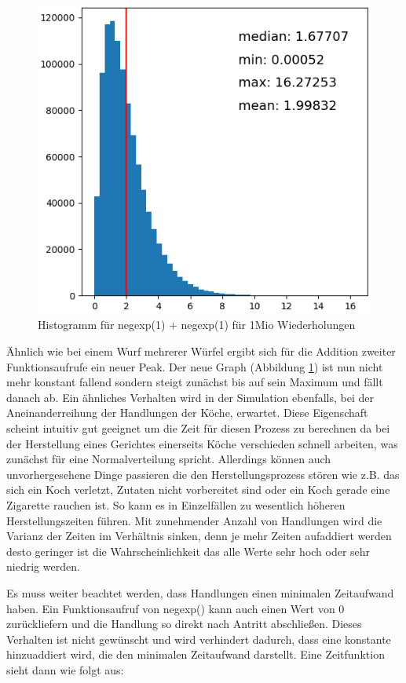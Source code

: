 \begin{figure}[ht]
  \includegraphics[width=1\textwidth]{pics/negexp2.png}
  \caption{Histogramm für negexp(1) + negexp(1) für 1Mio Wiederholungen}
  \label{pic:negexp2}
\end{figure}

Ähnlich wie bei einem Wurf mehrerer Würfel ergibt sich für die Addition zweiter Funktionsaufrufe ein neuer Peak. Der neue Graph (Abbildung \ref{pic:negexp2}) ist nun nicht mehr konstant fallend sondern steigt zunächst bis auf sein Maximum und fällt danach ab. Ein ähnliches Verhalten wird in der Simulation ebenfalls, bei der Aneinanderreihung der Handlungen der Köche, erwartet. Diese Eigenschaft scheint intuitiv gut geeignet um die Zeit für diesen Prozess zu berechnen da bei der Herstellung eines Gerichtes einerseits Köche verschieden schnell arbeiten, was zunächst für eine Normalverteilung spricht. Allerdings können auch unvorhergesehene Dinge passieren die den Herstellungsprozess stören wie z.B. das sich ein Koch verletzt, Zutaten nicht vorbereitet sind oder ein Koch gerade eine Zigarette rauchen ist. So kann es in Einzelfällen zu wesentlich höheren Herstellungszeiten führen. Mit zunehmender Anzahl von Handlungen wird die Varianz der Zeiten im Verhältnis sinken, denn je mehr Zeiten aufaddiert werden desto geringer ist die Wahrscheinlichkeit das alle Werte sehr hoch oder sehr niedrig werden.

Es muss weiter beachtet werden, dass Handlungen einen minimalen Zeitaufwand haben. Ein Funktionsaufruf von negexp() kann auch einen Wert von 0 zurückliefern und die Handlung so direkt nach Antritt abschließen. Dieses Verhalten ist nicht gewünscht und wird verhindert dadurch, dass eine konstante hinzuaddiert wird, die den minimalen Zeitaufwand darstellt. Eine Zeitfunktion sieht dann wie folgt aus:

